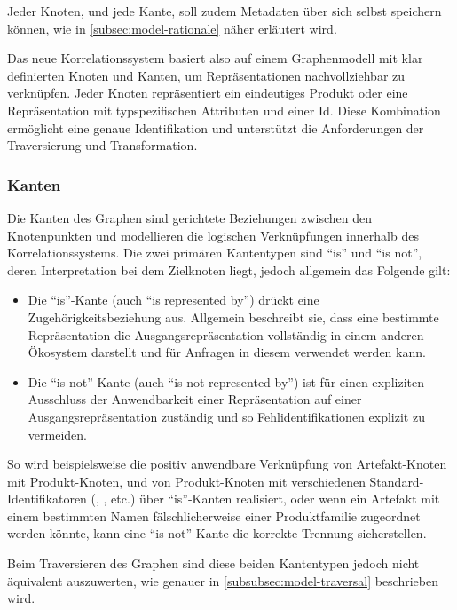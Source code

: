 Jeder Knoten, und jede Kante, soll zudem Metadaten über sich selbst speichern können, wie in \autoref{subsec:model-rationale} näher erläutert wird.

Das neue Korrelationssystem basiert also auf einem Graphenmodell mit klar definierten Knoten und Kanten, um Repräsentationen nachvollziehbar zu verknüpfen.
Jeder Knoten repräsentiert ein eindeutiges Produkt oder eine Repräsentation mit typspezifischen Attributen und einer Id.
Diese Kombination ermöglicht eine genaue Identifikation und unterstützt die Anforderungen der Traversierung und Transformation.

\subsubsection{Kanten}\label{subsubsec:model-edges-relations}

Die Kanten des Graphen sind gerichtete Beziehungen zwischen den Knotenpunkten und modellieren die logischen Verknüpfungen innerhalb des Korrelationssystems.
Die zwei primären Kantentypen sind \enquote{is} und \enquote{is not}, deren Interpretation bei dem Zielknoten liegt, jedoch allgemein das Folgende gilt:

\begin{itemize}
    \itemsep0em
    \item Die \enquote{is}-Kante (auch \enquote{is represented by}) drückt eine Zugehörigkeitsbeziehung aus.
    Allgemein beschreibt sie, dass eine bestimmte Repräsentation die Ausgangsrepräsentation vollständig in einem anderen Ökosystem darstellt und für Anfragen in diesem verwendet werden kann.
    \item Die \enquote{is not}-Kante (auch \enquote{is not represented by}) ist für einen expliziten Ausschluss der Anwendbarkeit einer Repräsentation auf einer Ausgangsrepräsentation zuständig und so Fehlidentifikationen explizit zu vermeiden.
\end{itemize}

So wird beispielsweise die positiv anwendbare Verknüpfung von Artefakt-Knoten mit Produkt-Knoten, und von Produkt-Knoten mit verschiedenen Standard-Identifikatoren (, , etc.) über \enquote{is}-Kanten realisiert, oder wenn ein Artefakt mit einem bestimmten Namen fälschlicherweise einer Produktfamilie zugeordnet werden könnte, kann eine \enquote{is not}-Kante die korrekte Trennung sicherstellen.

Beim Traversieren des Graphen sind diese beiden Kantentypen jedoch nicht äquivalent auszuwerten, wie genauer in \autoref{subsubsec:model-traversal} beschrieben wird.

